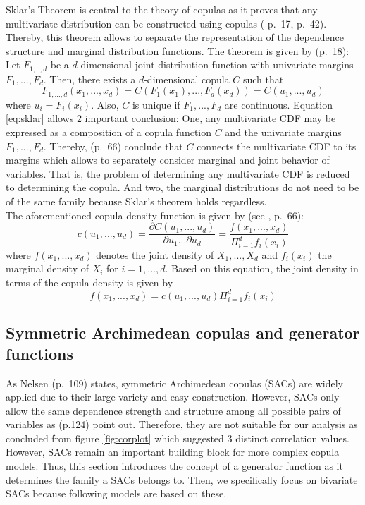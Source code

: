 \documentclass[
]{krantz}
\begin{document}
Sklar's Theorem is central to the theory of copulas as it proves
that any multivariate distribution can be constructed using copulas
(\citet{nelsen2006} p.~17, \citet{durante2016} p.~42). Thereby, this theorem allows
to separate the representation of the dependence structure and marginal
distribution functions. The theorem is given by \citet{nelsen2006} (p.~18):\\
Let \(F_{1,..,d}\) be a \(d\)-dimensional joint distribution function with
univariate margins \(F_1, ..., F_d\). Then, there exists a \(d\)-dimensional
copula \(C\) such that\\
\[
F_{1, ..., d}(x_1, ..., x_d)  = C(F_1(x_1), ..., F_d(x_d)) = C(u_1, ..., u_d)
\label{eq:sklar}
\]
where \(u_i = F_i(x_i)\). Also, \(C\) is unique if \(F_1, ..., F_d\) are continuous.
Equation \eqref{eq:sklar} allows \(2\) important conclusion: One,
any multivariate CDF may be expressed as a composition of a copula
function \(C\) and the univariate margins \(F_1, ..., F_d\). Thereby,
\citet{zhang2019} (p.~66) conclude that \(C\) connects the multivariate CDF to
its margins which allows to separately consider marginal and
joint behavior of variables. That is, the problem of determining any
multivariate CDF is reduced to determining the copula. And two, the
marginal distributions do not need to be of the same family because
Sklar's theorem holds regardless.\\
The aforementioned copula density function is given by (see
\citet{zhang2019}, p.~66):\\
\[
c(u_1, ..., u_d) = \frac{\partial C(u_1, ..., u_d)}{\partial u_1 ... \partial u_d} = \frac{f(x_1, ..., x_d)}{\Pi_{i = 1}^df_i(x_i)}
\label{eq:copulapdf}
\]
where \(f(x_1, ..., x_d)\) denotes the joint density of \(X_1, ..., X_d\)
and \(f_i(x_i)\) the marginal density of \(X_i\) for
\(i = 1, ..., d\). Based on this equation, the joint density in terms of the copula density is given by\\
\[
f(x_1, ..., x_d) = c(u_1, ..., u_d)\Pi_{i = 1}^df_i(x_i)
\label{eq:marginalpdf}
\]

\subsection{Symmetric Archimedean copulas and generator functions}\label{archcops}

As Nelsen (p.~109) states, symmetric Archimedean copulas (SACs) are
widely applied due to their large variety and easy construction. However, SACs only allow the same
dependence strength and structure among all possible pairs of variables as \citet{zhang2019}
(p.124) point out. Therefore, they are not suitable for our analysis as concluded from figure \ref{fig:corplot} which suggested \(3\) distinct correlation values.
However, SACs remain an important building block for more complex copula models.
Thus, this section introduces the concept of a generator function as it determines the family a SACs belongs to.
Then, we specifically focus on bivariate SACs because following models are based on these.
\end{document}
